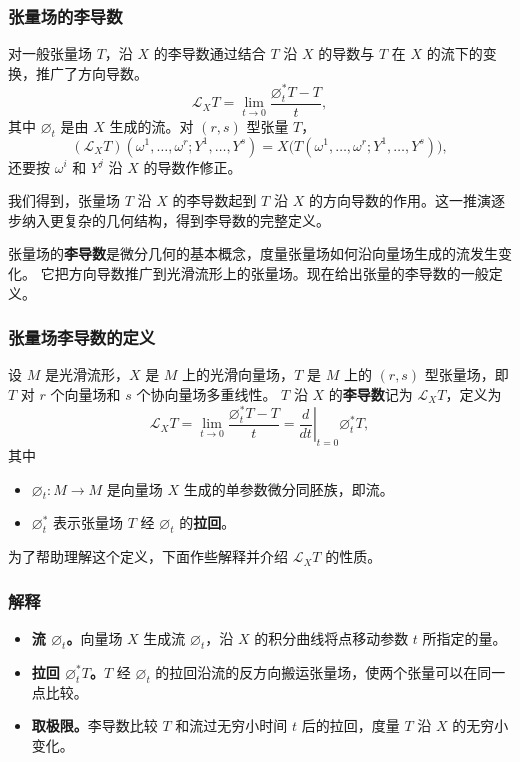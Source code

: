 \subsubsection{张量场的李导数}
对一般张量场 $T$，沿 $X$ 的李导数通过结合 $T$ 沿 $X$ 的导数与 $T$ 在 $X$ 的流下的变换，推广了方向导数。
\[
  \mathcal L_X T=\lim_{t\to0}\frac{\varnothing_t^*T-T}{t},
\]
其中 $\varnothing_t$ 是由 $X$ 生成的流。对 $(r,s)$ 型张量 $T$，
\[
  (\mathcal L_XT)(\omega^1,\ldots,\omega^r;Y^1,\ldots,Y^s)
    =X\bigl(T(\omega^1,\ldots,\omega^r;Y^1,\ldots,Y^s)\bigr),
\]
还要按 $\omega^i$ 和 $Y^j$ 沿 $X$ 的导数作修正。

我们得到，张量场 $T$ 沿 $X$ 的李导数起到 $T$ 沿 $X$ 的方向导数的作用。这一推演逐步纳入更复杂的几何结构，得到李导数的完整定义。

张量场的\textbf{李导数}是微分几何的基本概念，度量张量场如何沿向量场生成的流发生变化。
它把方向导数推广到光滑流形上的张量场。现在给出张量的李导数的一般定义。

\subsubsection{张量场李导数的定义}
设 $M$ 是光滑流形，$X$ 是 $M$ 上的光滑向量场，$T$ 是 $M$ 上的 $(r,s)$ 型张量场，即 $T$ 对 $r$ 个向量场和 $s$ 个协向量场多重线性。 $T$ 沿 $X$ 的\textbf{李导数}记为 $\mathcal L_X T$，定义为
\[
  \mathcal L_X T=\lim_{t\to0}\frac{\varnothing_t^*T-T}{t}
                =\left.\frac{d}{dt}\right|_{t=0}\varnothing_t^*T,
\]
其中
\begin{itemize}
  \item $\varnothing_t\colon M\to M$ 是向量场 $X$ 生成的单参数微分同胚族，即流。
  \item $\varnothing_t^*$ 表示张量场 $T$ 经 $\varnothing_t$ 的\textbf{拉回}。
\end{itemize}
为了帮助理解这个定义，下面作些解释并介绍 $\mathcal L_X T$ 的性质。

\subsubsection{解释}
\begin{itemize}
  \item \textbf{流 $\varnothing_t$。}向量场 $X$ 生成流 $\varnothing_t$，沿 $X$ 的积分曲线将点移动参数 $t$ 所指定的量。
  \item \textbf{拉回 $\varnothing_t^*T$。}$T$ 经 $\varnothing_t$ 的拉回沿流的反方向搬运张量场，使两个张量可以在同一点比较。
  \item \textbf{取极限。}李导数比较 $T$ 和流过无穷小时间 $t$ 后的拉回，度量 $T$ 沿 $X$ 的无穷小变化。
\end{itemize}

